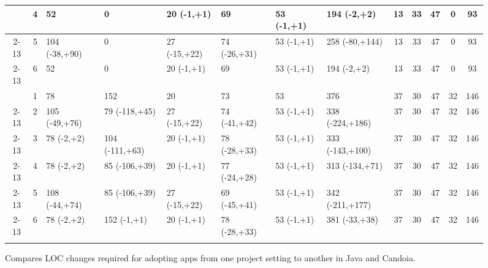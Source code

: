 \begin{figure}
\begin{adjustbox}{max width=\textwidth}
\begin{tabular}{|c|c|l|l|l|l|l|l|c|c|c|c|c|}
\begin{comment}
\cline{2-13} & 4 & 52 & 0 & 20 (-1,+1) & 69 & 53 (-1,+1) & 194 (-2,+2) & 13 & 33 & 47 & 0 & 93 \\

\cline{2-13} & 5 & 104 (-38,+90) & 0 & 27 (-15,+22) & 74 (-26,+31) & 53 (-1,+1)
& 258 (-80,+144) & 13 & 33 & 47 & 0 & 93 \\

\cline{2-13} & 6 & 52 & 0 & 20 (-1,+1) & 69 & 53 (-1,+1) & 194 (-2,+2)
& 13 & 33 & 47 & 0 & 93 \\ \hline
\end{comment}


\begin{comment}
\multirow{6}{*}{\begin{sideways}BugSrc Mapper\end{sideways}}
& 1 & 78 & 152 & 20 & 73 & 53 & 376 & 37 & 30 & 47 & 32 & 146 \\ 

\cline{2-13} & 2 & 105 (-49,+76) & 79 (-118,+45) & 27 (-15,+22) & 74 (-41,+42) &
53 (-1,+1) & 338 (-224,+186) & 37 & 30 & 47 & 32 & 146 \\

\cline{2-13} & 3 & 78 (-2,+2) & 104 (-111,+63) & 20 (-1,+1) & 78 (-28,+33) & 53
(-1,+1) & 333 (-143,+100) & 37 & 30 & 47 & 32 & 146 \\

\cline{2-13} & 4 & 78 (-2,+2) & 85 (-106,+39) & 20 (-1,+1) & 77 (-24,+28) & 53
(-1,+1) & 313 (-134,+71) & 37 & 30 & 47 & 32 & 146 \\

\cline{2-13} & 5 & 108 (-44,+74) & 85 (-106,+39) & 27 (-15,+22) & 69 (-45,+41) &
53 (-1,+1) & 342 (-211,+177) & 37 & 30 & 47 & 32 & 146 \\

\cline{2-13} & 6 & 78 (-2,+2) & 152 (-1,+1) & 20 (-1,+1) & 78 (-28,+33) & 53
(-1,+1) & 381 (-33,+38) & 37 & 30 & 47 & 32 & 146 \\
\hline

\end{comment}
\end{tabular}
\end{adjustbox}
\caption{Compares LOC changes required for adopting apps from one project
setting to another in Java and Candoia.}
\label{fig:adoptability}
\end{figure}